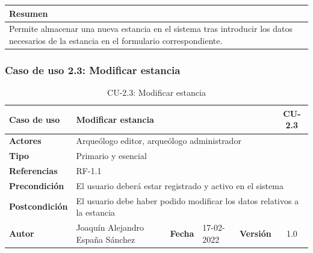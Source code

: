     \begin{table}[H]
        \centering
        \begin{tabularx}{\textwidth}{@{} |L |@{}} \hline
            \textbf{Resumen} \\
            \hline
            Permite almacenar una nueva estancia en el sistema tras introducir los datos
            necesarios de la estancia en el formulario correspondiente.\\
            \hline
        \end{tabularx}
    \end{table}

\subsubsection{Caso de uso 2.3: Modificar estancia}

    \begin{table}[H]
    \begin{center}
        \begin{adjustbox}{width=\textwidth}
        \begin{tabular}{ | l | l | l | l | c | c | } 
            \hline
            \textbf{Caso de uso} & \multicolumn{4}{l|}{Modificar estancia} & \cellcolor{gray!50} \textbf{CU-2.3}\\
            \hline
            \textbf{Actores} & \multicolumn{5}{p{0.9\linewidth}|}{Arqueólogo editor, arqueólogo administrador} \\
            \hline
            \textbf{Tipo} & \multicolumn{5}{l|}{Primario y esencial} \\
            \hline
            \textbf{Referencias} & \multicolumn{3}{l|}{RF-1.1} & \multicolumn{2}{l|}{ }\\
            \hline
            \textbf{Precondición} & \multicolumn{5}{l|}{El usuario deberá estar registrado y activo en el sistema} \\
            \hline
            \textbf{Postcondición} & \multicolumn{5}{l|}{El usuario debe haber podido modificar los datos relativos a la
            estancia} \\
            \hline
            \textbf{Autor} & \multicolumn{1}{p{0.25\linewidth}|}{Joaquín Alejandro España Sánchez} & \textbf{Fecha} & 
            17-02-2022     & \textbf{Versión}                                                      & 1.0\\
            \hline
        \end{tabular}
        \end{adjustbox}
        \caption{CU-2.3: Modificar estancia}
        \label{tab:modify-room}
    \end{center}
    \end{table}

